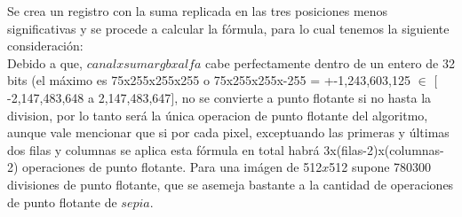 Se crea un registro con la suma replicada en las tres posiciones menos significativas y se procede a calcular la fórmula, para lo cual tenemos la siguiente consideración:\\
 
Debido a que, $canal x sumargb x alfa$ cabe perfectamente dentro de un entero de 32 bits (el máximo es 75x255x255x255 o 75x255x255x-255 = +-1,243,603,125 $\in$ $[$-2,147,483,648 a 2,147,483,647$]$, no se convierte a punto flotante si no hasta la division, por lo tanto será la única operacion de punto flotante del algoritmo, aunque vale mencionar que si por cada pixel, exceptuando las primeras y últimas dos filas y columnas se aplica esta fórmula en total habrá 3x(filas-2)x(columnas-2) operaciones de punto flotante. Para una imágen de 512$x$512 supone 780300 divisiones de punto flotante, que se asemeja bastante a la cantidad de operaciones de punto flotante de $sepia$.


